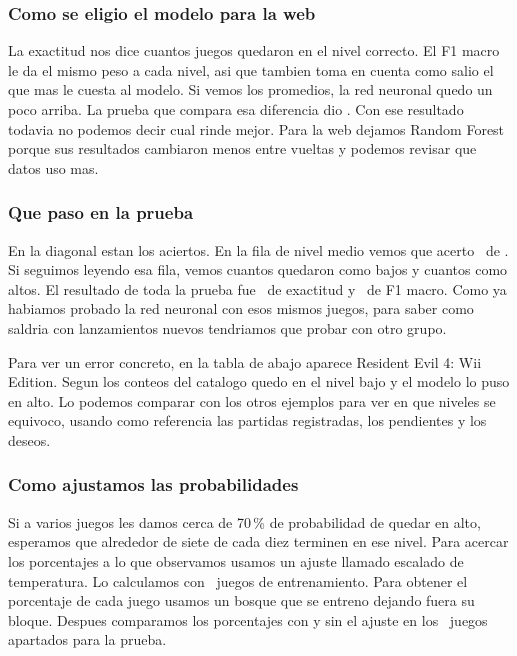 \documentclass[letterpaper,11pt]{article}
\begin{document}
\subsubsection{Como se eligio el modelo para la web}
\ComparacionModelos

La exactitud nos dice cuantos juegos quedaron en el nivel correcto. El F1 macro le da el mismo peso a cada nivel, asi que tambien toma en cuenta como salio el que mas le cuesta al modelo. Si vemos los promedios, la red neuronal quedo un poco arriba. La prueba que compara esa diferencia dio \PComparacion. Con ese resultado todavia no podemos decir cual rinde mejor. Para la web dejamos Random Forest porque sus resultados cambiaron menos entre vueltas y podemos revisar que datos uso mas.

\subsubsection{Que paso en la prueba}
\MatrizConfusion

En la diagonal estan los aciertos. En la fila de nivel medio vemos que acerto \AciertosMedio\ de \TotalMedio. Si seguimos leyendo esa fila, vemos cuantos quedaron como bajos y cuantos como altos. El resultado de toda la prueba fue \ExactitudPrueba\ de exactitud y \FPrueba\ de F1 macro. Como ya habiamos probado la red neuronal con esos mismos juegos, para saber como saldria con lanzamientos nuevos tendriamos que probar con otro grupo.

Para ver un error concreto, en la tabla de abajo aparece Resident Evil 4: Wii Edition. Segun los conteos del catalogo quedo en el nivel bajo y el modelo lo puso en alto. Lo podemos comparar con los otros ejemplos para ver en que niveles se equivoco, usando como referencia las partidas registradas, los pendientes y los deseos.

\EjemplosError

\subsubsection{Como ajustamos las probabilidades}
Si a varios juegos les damos cerca de 70\,\% de probabilidad de quedar en alto, esperamos que alrededor de siete de cada diez terminen en ese nivel. Para acercar los porcentajes a lo que observamos usamos un ajuste llamado escalado de temperatura. Lo calculamos con \JuegosCalibracion\ juegos de entrenamiento. Para obtener el porcentaje de cada juego usamos un bosque que se entreno dejando fuera su bloque. Despues comparamos los porcentajes con y sin el ajuste en los \JuegosPrueba\ juegos apartados para la prueba.
\end{document}
